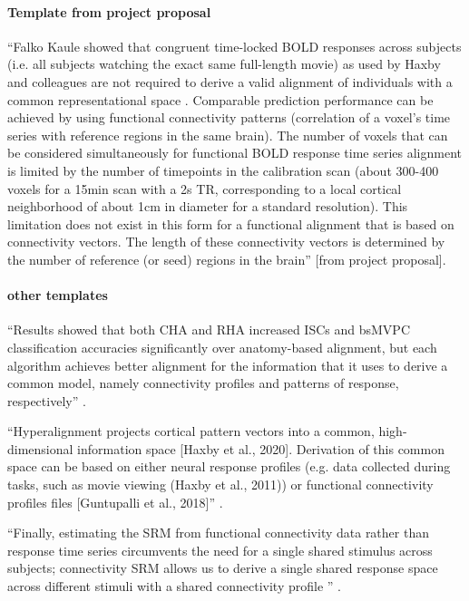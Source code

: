 \paragraph{Template from project proposal}
%
``Falko Kaule showed that congruent time-locked BOLD responses across subjects
(i.e. all subjects watching the exact same full-length movie) as used by Haxby
and colleagues are not required to derive a valid alignment of individuals with
a common representational space \citep{kaule2017examination}.
%
Comparable prediction performance can be achieved by using functional
connectivity patterns (correlation of a voxel's time series with reference
regions in the same brain).
%
The number of voxels that can be considered simultaneously for functional BOLD
response time series alignment is limited by the number of timepoints in the
calibration scan (about 300-400 voxels for a 15min scan with a 2s TR,
corresponding to a local cortical neighborhood of about 1cm in diameter for a
standard resolution).
%
This limitation does not exist in this form for a functional alignment that is
based on connectivity vectors.
%
The length of these connectivity vectors is determined by the number of
reference (or seed) regions in the brain'' [from project proposal].


\paragraph{other templates}
%
``Results showed that both CHA and RHA increased ISCs and bsMVPC classification
accuracies significantly over anatomy-based alignment, but each algorithm
achieves better alignment for the information that it uses to derive a common
model, namely connectivity profiles and patterns of response, respectively''
\citep{guntupalli2018computational}.

%
``Hyperalignment projects cortical pattern vectors into a common,
high-dimensional information space [Haxby et al., 2020].
%
Derivation of this common space can be based on either neural response profiles
(e.g. data collected during tasks, such as movie viewing (Haxby et al., 2011))
or functional connectivity profiles files [Guntupalli et al., 2018]''
\citep{busch2021hybrid}.

``Finally, estimating the SRM from functional connectivity data rather than
response time series circumvents the need for a single shared stimulus across
subjects; connectivity SRM allows us to derive a single shared response space
across different stimuli with a shared connectivity profile
\citep{nastase2019leveraging}'' \citep{kumar2020brainiak}.


